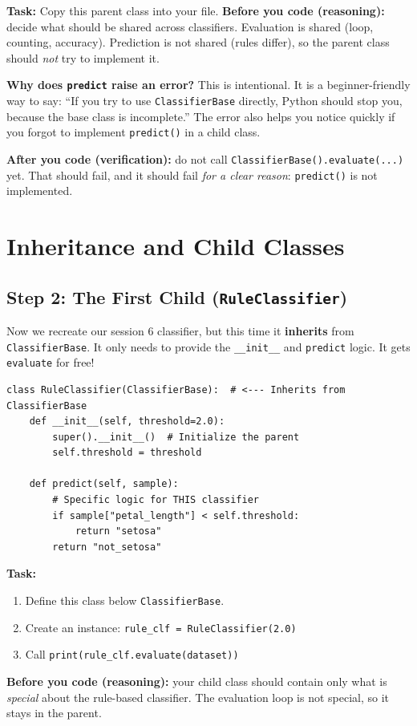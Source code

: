 \noindent
\textbf{Task:} Copy this parent class into your file.
\noindent
\textbf{Before you code (reasoning):} decide what should be shared across classifiers.
Evaluation is shared (loop, counting, accuracy). Prediction is not shared (rules differ), so the parent class should \textit{not} try to implement it.

\noindent
\textbf{Why does \texttt{predict} raise an error?}
This is intentional.
It is a beginner-friendly way to say: ``If you try to use \texttt{ClassifierBase} directly, Python should stop you, because the base class is incomplete.''
The error also helps you notice quickly if you forgot to implement \texttt{predict()} in a child class.

\noindent
\textbf{After you code (verification):} do not call \texttt{ClassifierBase().evaluate(...)} yet.
That should fail, and it should fail \textit{for a clear reason}: \texttt{predict()} is not implemented.


\section{Inheritance and Child Classes}


\subsection{Step 2: The First Child (\texttt{RuleClassifier})}
Now we recreate our session 6 classifier, but this time it \textbf{inherits} from \texttt{ClassifierBase}.
It only needs to provide the \texttt{\_\_init\_\_} and \texttt{predict} logic. It gets \texttt{evaluate} for free!

\begin{verbatim}
class RuleClassifier(ClassifierBase):  # <--- Inherits from ClassifierBase
    def __init__(self, threshold=2.0):
        super().__init__()  # Initialize the parent
        self.threshold = threshold

    def predict(self, sample):
        # Specific logic for THIS classifier
        if sample["petal_length"] < self.threshold:
            return "setosa"
        return "not_setosa"
\end{verbatim}

\noindent
\textbf{Task:}
\begin{enumerate}
    \item Define this class below \texttt{ClassifierBase}.
    \item Create an instance: \texttt{rule\_clf = RuleClassifier(2.0)}
    \item Call \texttt{print(rule\_clf.evaluate(dataset))}
\end{enumerate}
\noindent
\textbf{Before you code (reasoning):} your child class should contain only what is \textit{special} about the rule-based classifier.
The evaluation loop is not special, so it stays in the parent.

